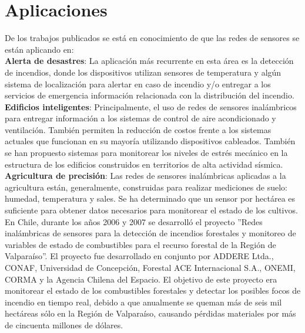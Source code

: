 \section{Aplicaciones}
De los trabajos publicados se está en conocimiento de que las redes de sensores se están aplicando en\cite{WileyWSN}: \\

\textbf{Alerta de desastres}: La aplicación más recurrente en esta área es la detección de incendios, donde los dispositivos utilizan sensores de temperatura y algún sistema de localización para alertar en caso de incendio y/o entregar a los servicios de emergencia información relacionada con la distribución del incendio.\\

\textbf{Edificios inteligentes}: Principalmente, el uso de redes de sensores inalámbricos para entregar información a los sistemas de control de aire acondicionado y ventilación. También permiten la reducción de costos frente a los sistemas actuales que funcionan en su mayoría utilizando dispositivos cableados. También se han propuesto sistemas para monitorear los niveles de estrés mecánico en la estructura de los edificios construidos en territorios de alta actividad sísmica.\\

\textbf{Agricultura de precisión}: Las redes de sensores inalámbricas aplicadas a la agricultura están, generalmente, construidas para realizar mediciones de suelo: humedad, temperatura y sales. Se ha determinado que un sensor por hectárea es suficiente para obtener datos necesarios para monitorear el estado de los cultivos.\\


En Chile, durante los años 2006 y 2007 se desarrolló el proyecto ''Redes inalámbricas de sensores para la detección de incendios forestales y monitoreo de variables de estado de combustibles para el recurso forestal de la Región de Valparaíso''\cite{ProyectoForestal}. El proyecto fue desarrollado en conjunto por ADDERE Ltda., CONAF, Universidad de Concepción, Forestal ACE Internacional S.A., ONEMI, CORMA y la Agencia Chilena del Espacio. El objetivo de este proyecto era monitorear el estado de los combustibles forestales y detectar los posibles focos de incendio en tiempo real, debido a que anualmente se queman más de seis mil hectáreas sólo en la Región de Valparaíso, causando pérdidas materiales por más de cincuenta millones de dólares.\\

